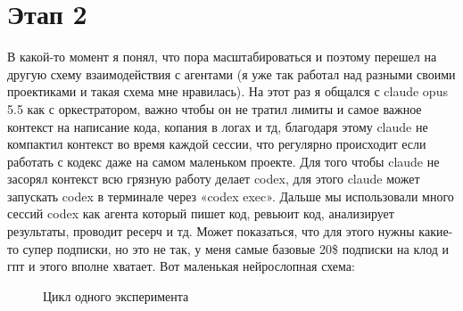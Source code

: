 \documentclass[11pt,a4paper]{article}
\begin{document}
\section{Этап 2}

В какой-то момент я понял, что пора масштабироваться и поэтому перешел на другую схему взаимодействия с агентами (я уже так работал над разными своими проектиками и такая схема мне нравилась). На этот раз я общался с claude opus 5.5 как с оркестратором, важно чтобы он не тратил лимиты и самое важное контекст на написание кода, копания в логах и тд, благодаря этому claude не компактил контекст во время каждой сессии, что регулярно происходит если работать с кодекс даже на самом маленьком проекте. Для того чтобы claude не засорял контекст всю грязную работу делает codex, для этого claude может запускать codex в терминале через «codex exec». Дальше мы использовали много сессий codex как агента который пишет код, ревьюит код, анализирует результаты, проводит ресерч и тд. Может показаться, что для этого нужны какие-то супер подписки, но это не так, у меня самые базовые 20\$ подписки на клод и гпт и этого вполне хватает. Вот маленькая нейрослопная схема:

\begin{figure}[H]
\centering
{}
\caption{Цикл одного эксперимента}
\label{fig:agents}
\end{figure}
\end{document}
